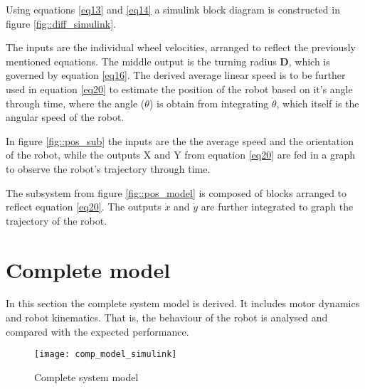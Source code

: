 Using equations \ref{eq13} and \ref{eq14} a simulink block diagram is constructed in figure \ref{fig::diff_simulink}.


The inputs are the individual wheel velocities, arranged to reflect the previously mentioned equations. The middle output is the turning radius \textbf{D}, which is governed by equation \ref{eq16}. The derived average linear speed is to be further used in equation \ref{eq20} to estimate the position of the robot based on it's angle through time, where the angle ($\theta$) is   obtain from integrating $\dot{\theta}$, which itself is the angular speed of the robot. 


In figure \ref{fig::pos_sub} the inputs are the the average speed and the orientation of the robot, while the outputs X and Y from equation \ref{eq20} are fed in a graph to observe the robot's trajectory through time. 


The subsystem from figure \ref{fig::pos_model} is composed of blocks arranged to reflect equation \ref{eq20}. The outputs $\dot{x}$ and $\dot{y}$ are further integrated to graph the trajectory of the robot.

\section{Complete model}

In this section the complete system model is derived. It includes motor dynamics and robot kinematics. That is, the behaviour of the robot is analysed and compared with the expected performance.

\begin{figure}[h]
\centering
\texttt{[image: comp\_model\_simulink]}
\caption{Complete system model}
\label{fig::com_model}
\end{figure} 

